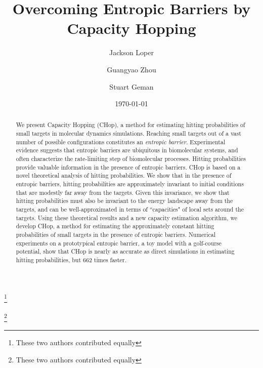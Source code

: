 \documentclass[english, aip, jcp, priprint, graphicx,floatfix]{revtex4-1}
\theoremstyle{plain}
\theoremstyle{definition}
\theoremstyle{plain}
\begin{document}
\title{Overcoming Entropic Barriers by Capacity Hopping} %

\author{Jackson Loper}
\thanks{These two authors contributed equally}

\author{Guangyao Zhou}
\thanks{These two authors contributed equally}

\author{Stuart Geman}

\date{\today}

\begin{abstract}
	We present Capacity Hopping (CHop), a method for estimating hitting probabilities of small targets in molecular dynamics simulations. Reaching small targets out of a vast number of possible configurations constitutes an \emph{entropic barrier}. Experimental evidence suggests that entropic barriers are ubiquitous in biomolecular systems, and often characterize the rate-limiting step of biomolecular processes. Hitting probabilities provide valuable information in the presence of entropic barriers. CHop is based on a novel theoretical analysis of hitting probabilities. We show that in the presence of entropic barriers, hitting probabilities are approximately invariant to initial conditions that are modestly far away from the targets.  Given this invariance, we show that hitting probabilities must also be invariant to the energy landscape away from the targets, and can be well-approximated in terms of ``capacities" of local sets around the targets.  Using these theoretical results and a new capacity estimation algorithm, we develop CHop, a method for estimating the approximately constant hitting probabilities of small targets in the presence of entropic barriers. Numerical experiments on a prototypical entropic barrier, a toy model with a golf-course potential, show that CHop is nearly as accurate as direct simulations in estimating hitting probabilities, but 662 times faster.
\end{abstract}

\pacs{}%

\maketitle %
\end{document}
